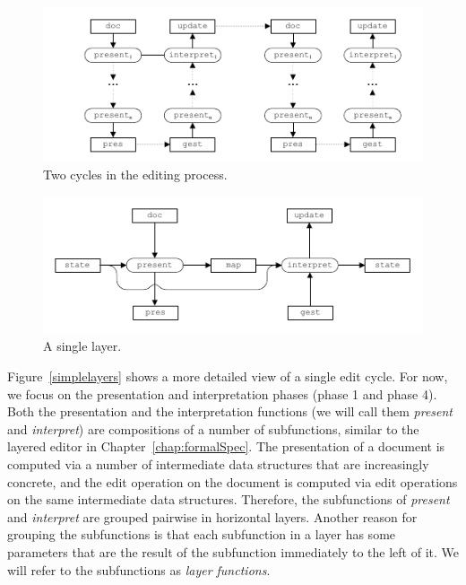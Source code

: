 \documentclass[preprint,natbib]{sigplanconf}
\begin{document}
\begin{figure}
\includegraphics[width=\columnwidth]{images/EditCycles}
\caption{Two cycles in the editing process.}\label{simpleeditprocess} 
\end{figure}



\begin{figure}
\includegraphics[width=\columnwidth]{images/SingleLayer}
\caption{A single layer.}\label{simplesinglelayer} 
\end{figure}

\bc {}

Figure~\ref{simplelayers}  shows a more detailed view of a single edit cycle. For now, we focus on the presentation and interpretation phases (phase 1 and phase 4). Both the presentation and the interpretation functions (we will call them {\em present} and {\em interpret}) are compositions of a number of subfunctions, similar to the layered editor in Chapter~\ref{chap:formalSpec}. The presentation of a document is computed via a number of intermediate data structures that are increasingly concrete, and the edit operation on the document is computed via edit operations on the same intermediate data structures. Therefore, the subfunctions of {\em present} and {\em interpret} are grouped pairwise in horizontal layers. Another reason for grouping the subfunctions is that each subfunction in a layer has some parameters that are the result of the subfunction immediately to the left of it. We will refer to the subfunctions as {\em layer functions}. \ec
\end{document}
